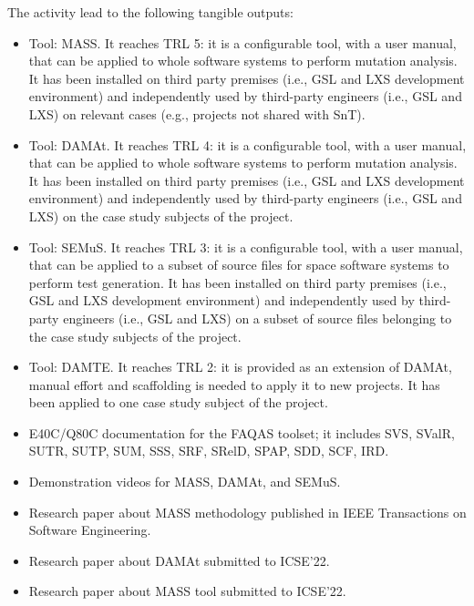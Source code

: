 The activity lead to the following tangible outputs:
\begin{itemize}
\item Tool: MASS. It reaches TRL 5: it is a configurable tool, with a user manual, that can be applied to whole software systems to perform mutation analysis. It has been installed on third party premises (i.e., GSL and LXS development environment)  and independently used by third-party engineers (i.e., GSL and LXS) on relevant cases (e.g., projects not shared with SnT).
\item Tool: DAMAt. It reaches TRL 4: it is a configurable tool, with a user manual, that can be applied to whole software systems to perform mutation analysis. It has been installed on third party premises (i.e., GSL and LXS development environment)  and independently used by third-party engineers (i.e., GSL and LXS) on the case study subjects of the project.
\item Tool: SEMuS. It reaches TRL 3: it is a configurable tool, with a user manual, that can be applied to a subset of source files for space software systems to perform test generation. It has been installed on third party premises (i.e., GSL and LXS development environment)  and independently used by third-party engineers (i.e., GSL and LXS) on a subset of source files belonging to the case study subjects of the project.
\item Tool: DAMTE. It reaches TRL 2: it is provided as an extension of DAMAt, manual effort and scaffolding is needed to apply it to new projects. It has been applied to one case study subject of the project.
\item E40C/Q80C documentation for the FAQAS toolset; it includes SVS, SValR, SUTR, SUTP, SUM, SSS, SRF, SRelD, SPAP, SDD, SCF, IRD.
\item Demonstration videos for MASS, DAMAt, and SEMuS.
\item Research paper about MASS methodology published in IEEE Transactions on Software Engineering\cite{Oscar:MASS:TSE}.
\item Research paper about DAMAt submitted to ICSE'22.
\item Research paper about MASS tool submitted to ICSE'22.
\end{itemize}

\ENDCHANGEDWPT


